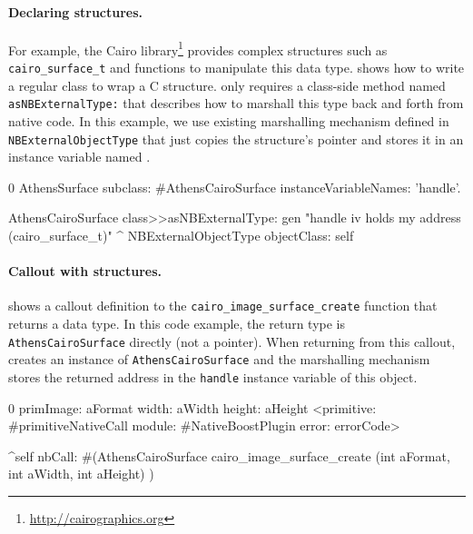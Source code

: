 \paragraph{Declaring structures.}
For example, the Cairo library\footnote{\url{http://cairographics.org}} provides complex structures such as \texttt{cairo\_surface\_t} and functions to manipulate this data type. %
 shows how to write a regular \ST class to wrap a C structure.
\NB only requires a class-side method named \texttt{asNBExternalType:} that describes how to marshall this type back and forth from native code.
In this example, we use existing marshalling mechanism defined in \texttt{NBExternalObjectType} that just copies the structure's pointer and stores it in an instance variable named .

\begin{stcode}[
	label={lst:AthensCairoSurface},
	caption={Example of C structure wrapping in \NB}]{0}
AthensSurface subclass: #AthensCairoSurface
	instanceVariableNames: 'handle'.

AthensCairoSurface class>>asNBExternalType: gen
	"handle iv holds my address (cairo_surface_t)"
	^ NBExternalObjectType objectClass: self
\end{stcode}

\paragraph{Callout with structures.}
 shows a callout definition to the \texttt{cairo\_image\_surface\_create} function that returns a  data type.
In this code example, the return type is \texttt{AthensCairoSurface} directly (not a pointer).
When returning from this callout, \NB creates an instance of \texttt{AthensCairoSurface} and the marshalling mechanism  stores the returned address in the \texttt{handle} instance variable of this object.

\begin{stcode}[
	label={lst:calloutOpaqueStruct},
	caption={Example of returning a structure by reference}]{0}
primImage: aFormat width: aWidth height: aHeight
	<primitive: #primitiveNativeCall
	 module: #NativeBoostPlugin
     error: errorCode>

	^self nbCall: #(AthensCairoSurface
		cairo_image_surface_create (int aFormat,
									int aWidth,
									int aHeight) )
\end{stcode}

